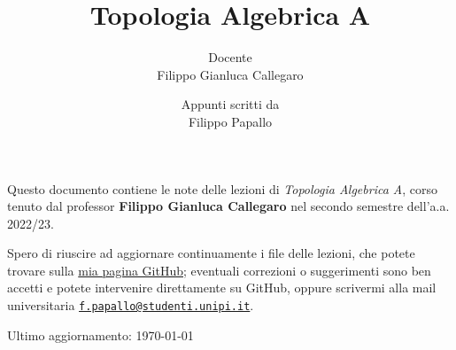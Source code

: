 \documentclass[a4paper, 10pt, oneside, DIV=9, chapterprefix=true, numbers=enddot,bibliography=totoc]{scrbook}
\title{Topologia Algebrica A}
\author{{\normalsize Docente}\\
	Filippo Gianluca Callegaro}
\date{{\normalsize Appunti scritti da}\\
	Filippo Papallo}
\begin{document}
\setlength{\parindent}{0pt}
\setlength{\parskip}{4pt}

\frontmatter
{}
\renewcommand{\thedummy}{\arabic{dummy}}
\maketitle
Questo documento contiene le note delle lezioni di \emph{Topologia Algebrica A},
corso tenuto dal professor \textbf{Filippo Gianluca Callegaro} nel secondo semestre
dell'a.a. 2022/23. 

Spero di riuscire ad aggiornare continuamente
i file delle lezioni, che potete trovare sulla 
\href{https://github.com/le-pap/Topologia-Algebrica-A}{mia pagina GitHub};
eventuali correzioni o suggerimenti sono ben accetti e potete intervenire direttamente
su GitHub, oppure scrivermi alla mail universitaria 
\href{mailto:f.papallo@studenti.unipi.it}{\texttt{f.papallo@studenti.unipi.it}}.

\hrulefill

Ultimo aggiornamento: \today
	
	
	
\tableofcontents
{}
\setcounter{llecture}{0}
\mainmatter{}
\renewcommand{\thedummy}{\thechapter.\arabic{dummy}}

\renewcommand{\thechapter}{\Roman{chapter}}

	

	

	

	
	
	

	

	

	

	

	

%	

%	

%	

%	

%	

%	

%	

%	

%	


\nocite{*}


\backmatter{}
\printbibliography[heading=bibintoc, title={References}]
\end{document}
